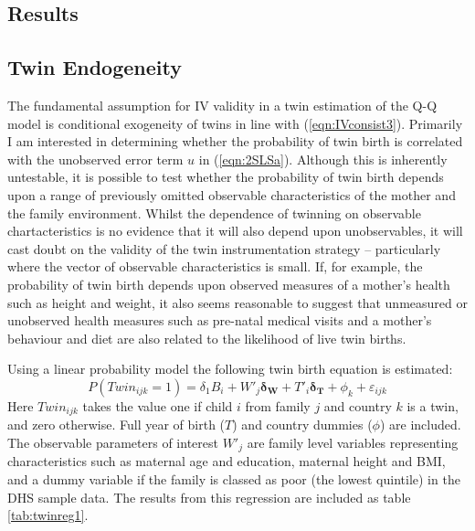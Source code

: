 \documentclass{article}[11pt,subeqn]
\newcommand{\vect}[1]{\mathbf{#1}}
\begin{document}
\begin{spacing}{1.5}
  
\section{Results}
\label{scn:results}
\subsection{Twin Endogeneity}
\label{scn:twinendog}
The fundamental assumption for IV validity in a twin estimation of the Q-Q model is conditional exogeneity of twins in line with (\ref{eqn:IVconsist3}).
Primarily I am interested in determining whether the probability of twin birth is correlated with the unobserved error term $u$ in (\ref{eqn:2SLSa}).  
Although this is inherently untestable, it is possible to test whether the probability of twin birth depends upon a range of previously omitted observable 
characteristics of the mother and the family environment.  Whilst the dependence of twinning on observable chartacteristics is no evidence that it will also 
depend upon unobservables, it will cast doubt on the validity of the twin instrumentation strategy -- particularly where the vector of observable 
characteristics is small.  If, for example, the probability of twin birth depends upon observed measures of a mother's health such as height and weight, 
it also seems reasonable to suggest that unmeasured or unobserved health measures such as pre-natal medical visits and a mother's behaviour and diet
are also related to the likelihood of live twin births. 
 
Using a linear probability model the following twin birth equation is estimated: 
\begin{equation}
\label{eqn:twinpred}
P(Twin_{ijk}=1)=\delta_1 B_i + W'_j\vect{\delta_\vect{W}}+ T'_{i}\vect{\delta_\vect{T}} +  \phi_k + \varepsilon_{ijk}
\end{equation}
Here $Twin_{ijk}$ takes the value one if child $i$ from family $j$ and country $k$ is a twin, and zero otherwise.  Full year of birth ($T$) and country
dummies ($\phi$) are included.  The observable parameters of interest $W'_j$ are family level variables representing characteristics such as maternal age and
education, maternal height and BMI, and a dummy variable if the family is classed as poor (the lowest quintile) in the DHS sample data. The results from this 
regression are included as table \ref{tab:twinreg1}.


\end{spacing}
\end{document}
